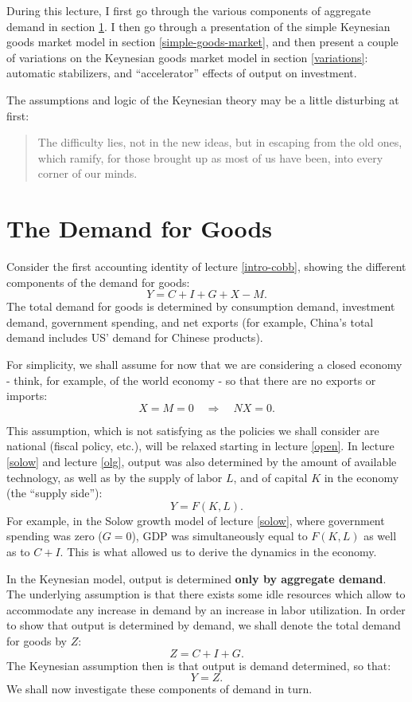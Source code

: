 \documentclass[]{book}
\begin{document}
During this lecture, I first go through the various components of
aggregate demand in section \ref{cons-function-demand-for-goods}. I then
go through a presentation of the simple Keynesian goods market model in
section \ref{simple-goods-market}, and then present a couple of
variations on the Keynesian goods market model in section
\ref{variations}: automatic stabilizers, and ``accelerator'' effects of
output on investment.

The assumptions and logic of the Keynesian theory may be a little
disturbing at first:

\begin{quote}
The difficulty lies, not in the new ideas, but in escaping from the old
ones, which ramify, for those brought up as most of us have been, into
every corner of our minds.
\end{quote}

\section{The Demand for Goods}\label{cons-function-demand-for-goods}

Consider the first accounting identity of lecture \ref{intro-cobb},
showing the different components of the demand for goods:
\[Y=C+I+G+X-M.\] The total demand for goods is determined by consumption
demand, investment demand, government spending, and net exports (for
example, China's total demand includes US' demand for Chinese products).

For simplicity, we shall assume for now that we are considering a closed
economy - think, for example, of the world economy - so that there are
no exports or imports: \[X=M=0 \quad \Rightarrow \quad NX=0.\]

This assumption, which is not satisfying as the policies we shall
consider are national (fiscal policy, etc.), will be relaxed starting in
lecture \ref{open}. In lecture \ref{solow} and lecture \ref{olg}, output
was also determined by the amount of available technology, as well as by
the supply of labor \(L\), and of capital \(K\) in the economy (the
``supply side''): \[Y=F\left(K, L\right).\] For example, in the Solow
growth model of lecture \ref{solow}, where government spending was zero
(\(G=0\)), GDP was simultaneously equal to \(F(K,L)\) as well as to
\(C+I\). This is what allowed us to derive the dynamics in the economy.

In the Keynesian model, output is determined \textbf{only by aggregate
demand}. The underlying assumption is that there exists some idle
resources which allow to accommodate any increase in demand by an
increase in labor utilization. In order to show that output is
determined by demand, we shall denote the total demand for goods by
\(Z\): \[Z=C+I+G.\] The Keynesian assumption then is that output is
demand determined, so that: \[Y=Z.\] We shall now investigate these
components of demand in turn.
\end{document}
